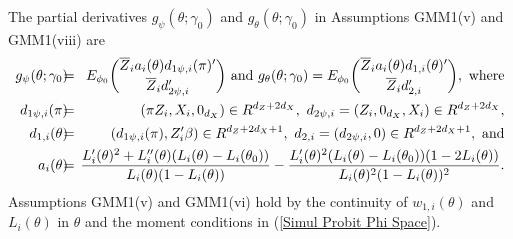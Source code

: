 \documentclass[12pt,titlepage,final,oneside,letterpaper]{article}
\begin{document}
The partial derivatives $g_{\psi }(\theta ;\gamma _{0})$ and $g_{\theta
}(\theta ;\gamma _{0})$ in Assumptions GMM1(v) and GMM1\linebreak (viii) are 
\begin{eqnarray}
g_{\psi }(\theta ;\gamma _{0})\hspace{-0.08in} &=&\hspace{-0.08in}E_{\phi
_{0}}\binom{\overline{Z}_{i}a_{i}(\theta )d_{1\psi ,i}(\pi )^{\prime }}{%
\overline{Z}_{i}d_{2\psi ,i}^{\prime }}\text{ and }g_{\theta }(\theta
;\gamma _{0})=E_{\phi _{0}}\binom{\overline{Z}_{i}a_{i}(\theta
)d_{1,i}(\theta )^{\prime }}{\overline{Z}_{i}d_{2,i}^{\prime }},\text{ where}
\notag \\
d_{1\psi ,i}(\pi )\hspace{-0.08in} &=&\hspace{-0.08in}(\pi
Z_{i},X_{i},0_{d_{X}})\in R^{d_{Z}+2d_{X}},\text{ }d_{2\psi
,i}=(Z_{i},0_{d_{X}},X_{i})\in R^{d_{Z}+2d_{X}},  \notag \\
d_{1,i}(\theta )\hspace{-0.08in} &=&\hspace{-0.08in}(d_{1\psi ,i}(\pi
),Z_{i}^{\prime }\beta )\in R^{d_{Z}+2d_{X}+1},\text{ }d_{2,i}=(d_{2\psi
,i},0)\in R^{d_{Z}+2d_{X}+1},\text{ and}  \label{Probit_1st derivative} \\
a_{i}(\theta )\hspace{-0.08in} &=&\hspace{-0.08in}\frac{L_{i}^{\prime
}(\theta )^{2}+L_{i}^{\prime \prime }(\theta )(L_{i}(\theta )-L_{i}(\theta
_{0}))}{L_{i}(\theta )(1-L_{i}(\theta ))}-\frac{L_{i}^{\prime }(\theta
)^{2}(L_{i}(\theta )-L_{i}(\theta _{0}))(1-2L_{i}(\theta ))}{L_{i}(\theta
)^{2}(1-L_{i}(\theta ))^{2}}.  \notag
\end{eqnarray}%
Assumptions GMM1(v) and GMM1(vi) hold by the continuity of $w_{1,i}(\theta )$
and $L_{i}(\theta )$ in $\theta $ and the moment conditions in (\ref{Simul
Probit Phi Space}).
\end{document}
